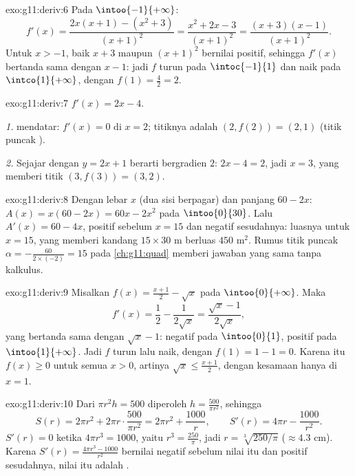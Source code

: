 \begin{solution}{exo:g11:deriv:6}
Pada $\intoo{-1}{+\infty}$:
\[
f'(x) = \frac{2x(x+1) - (x^2+3)}{(x+1)^2}
= \frac{x^2 + 2x - 3}{(x+1)^2}
= \frac{(x+3)(x-1)}{(x+1)^2}.
\]
Untuk $x > -1$, baik $x + 3$ maupun $(x+1)^2$ bernilai positif, sehingga
$f'(x)$ bertanda sama dengan $x - 1$: jadi $f$ turun pada $\intoc{-1}{1}$ dan
naik pada $\intco{1}{+\infty}$, dengan  $f(1) = \frac{4}{2} = 2$.
\end{solution}

\begin{solution}{exo:g11:deriv:7}
$f'(x) = 2x - 4$.

\emph{1.}  mendatar: $f'(x) = 0$ di $x = 2$; titiknya adalah
$(2, f(2)) = (2, 1)$ (titik puncak ).

\emph{2.} Sejajar dengan $y = 2x + 1$ berarti bergradien $2$: $2x - 4 = 2$,
jadi $x = 3$, yang memberi titik $(3, f(3)) = (3, 2)$.
\end{solution}

\begin{solution}{exo:g11:deriv:8}
Dengan lebar $x$ (dua sisi berpagar) dan panjang $60 - 2x$:
$A(x) = x(60 - 2x) = 60x - 2x^2$ pada $\intoo{0}{30}$. Lalu
$A'(x) = 60 - 4x$, positif sebelum $x = 15$ dan negatif sesudahnya: luasnya
 untuk $x = 15$, yang memberi kandang $15 \times 30$ m berluas
$450$ m$^2$. Rumus titik puncak $\alpha = -\frac{60}{2 \times (-2)} = 15$
pada \cref{ch:g11:quad} memberi jawaban yang sama tanpa kalkulus.
\end{solution}

\begin{solution}{exo:g11:deriv:9}
Misalkan $f(x) = \frac{x+1}{2} - \sqrt x$ pada $\intoo{0}{+\infty}$. Maka
\[
f'(x) = \frac12 - \frac{1}{2\sqrt x} = \frac{\sqrt x - 1}{2\sqrt x},
\]
yang bertanda sama dengan $\sqrt x - 1$: negatif pada $\intoo{0}{1}$, positif
pada $\intoo{1}{+\infty}$. Jadi $f$ turun lalu naik, dengan 
$f(1) = 1 - 1 = 0$. Karena itu $f(x) \geq 0$ untuk semua $x > 0$, artinya
$\sqrt x \leq \frac{x+1}{2}$, dengan kesamaan hanya di $x = 1$.
\end{solution}

\begin{solution}{exo:g11:deriv:10}
Dari $\pi r^2 h = 500$ diperoleh $h = \frac{500}{\pi r^2}$, sehingga
\[
S(r) = 2\pi r^2 + 2\pi r \cdot \frac{500}{\pi r^2}
= 2\pi r^2 + \frac{1000}{r},
\qquad
S'(r) = 4\pi r - \frac{1000}{r^2}.
\]
$S'(r) = 0$ ketika $4\pi r^3 = 1000$, yaitu $r^3 = \frac{250}{\pi}$, jadi
$r = \sqrt[3]{250/\pi}$ ($\approx 4.3$ cm). Karena $S'(r) =
\frac{4\pi r^3 - 1000}{r^2}$ bernilai negatif sebelum nilai itu dan positif
sesudahnya, nilai itu adalah .
\end{solution}

